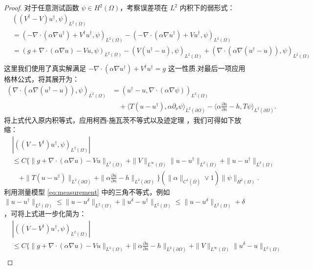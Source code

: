 \begin{proof}
对于任意测试函数 $\psi\in H^{2}(\Omega)$，考察误差项在 $L^2$ 内积下的弱形式：
\begin{align*}
&((V^{\dagger}-V)u^{\dagger},\psi)_{L^{2}(\Omega)} \\
&=(-\nabla\cdot(\alpha\nabla u^{\dagger})+V^{\dagger}u^{\dagger},\psi)_{L^{2}(\Omega)}-(-\nabla\cdot(\alpha\nabla u^{\dagger})+Vu^{\dagger},\psi)_{L^{2}(\Omega)} \\
&=(g+\nabla\cdot(\alpha\nabla u)-Vu,\psi)_{L^{2}(\Omega)}-(V(u^{\dagger}-u),\psi)_{L^{2}(\Omega)}+(\nabla\cdot(\alpha\nabla(u^{\dagger}-u)),\psi)_{L^{2}(\Omega)} \\
\end{align*}
这里我们使用了真实解满足 $-\nabla\cdot(\alpha\nabla u^{\dagger}) + V^{\dagger}u^{\dagger} = g$ 这一性质.对最后一项应用格林公式，将其展开为：
\begin{align*}
(\nabla\cdot(\alpha\nabla(u^{\dagger}-u)),\psi)_{L^{2}(\Omega)} &= (u^{\dagger}-u,\nabla\cdot(\alpha\nabla\psi))_{L^{2}(\Omega)} \\
&\quad + \langle T(u-u^{\dagger}),\alpha\partial_{\nu}\psi \rangle_{L^{2}(\partial\Omega)} - \langle \alpha\frac{\partial u}{\partial n}-h,T\psi \rangle_{L^{2}(\partial\Omega)}.
\end{align*}
将上式代入原内积等式，应用柯西-施瓦茨不等式以及迹定理 \cite[Section 5.5, Theorem 1]{evans2010partial}，我们可得如下放缩：
\begin{align*}
&|((V-V^{\dagger})u^{\dagger},\psi)_{L^{2}(\Omega)}| \\
&\leq C\Big\{ \|g+\nabla\cdot(\alpha\nabla u)-Vu\|_{L^{2}(\Omega)} + \|V\|_{L^{\infty}(\Omega)}\|u-u^{\dagger}\|_{L^{2}(\Omega)} + \|u-u^{\dagger}\|_{L^{2}(\Omega)} \\
&\quad+ \|T(u-u^{\dagger})\|_{L^{2}(\partial\Omega)} + \|\alpha\frac{\partial u}{\partial n}-h\|_{L^{2}(\partial\Omega)} \Big\} (\|\alpha\|_{C^{1}(\bar{\Omega})}\vee 1) \|\psi\|_{H^{2}(\Omega)}.
\end{align*}
利用测量模型 \eqref{eq:measurement} 中的三角不等式，例如 $\|u-u^{\dagger}\|_{L^{2}(\Omega)} \leq \|u-u^{\delta}\|_{L^{2}(\Omega)} + \|u^{\delta}-u^{\dagger}\|_{L^{2}(\Omega)} \leq \|u-u^{\delta}\|_{L^{2}(\Omega)} + \delta$，可将上式进一步化简为：
\begin{align*}
&|((V-V^{\dagger})u^{\dagger},\psi)_{L^{2}(\Omega)}| \\
&\leq C\Big\{ \|g+\nabla\cdot(\alpha\nabla u)-Vu\|_{L^{2}(\Omega)} + \|\alpha\frac{\partial u}{\partial n}-h\|_{L^{2}(\partial\Omega)} + \|V\|_{L^{\infty}(\Omega)}\|u^{\delta}-u\|_{L^{2}(\Omega)} \\

\end{align*}
\end{proof}
